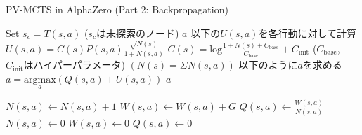 \begin{algorithm}
    \caption{PV-MCTS in AlphaZero (Part 2: Backpropagation)}
    \label{alg:mcts-2}
    \begin{algorithmic}[1]
                \State Set $s_{c} = T(s, a)$ ($s_c$は未探索のノード)
                \State {}
                \State \Return $a$
            \Else
                \State 以下の$U(s, a)$を各行動に対して計算
                \State $U(s, a)= C(s)P(s, a)\frac{\sqrt{N(s)}}{1+N(s, a)}$
                \State $C(s)=\textrm{log}\frac{1+N(s)+C_{\textrm{base}}}{C_{\textrm{base}}}+C_{\textrm{init}}$
                \State($C_{\textrm{base}}$, $C_{\textrm{init}}$はハイパーパラメータ)
                \State $(N(s)=\Sigma N(s, a))$
                \State 以下のように$a$を求める
                \State $a = {\underset{a}{\textrm{argmax}}} (Q(s, a)+U(s, a))$
                \State \Return $a$
                
            \EndIf
        \EndFunction
                \State $N(s, a) \gets  N(s, a)+1$
                \State $W(s, a) \gets  W(s, a)+G$
                \State $Q(s, a) \gets \frac{W(s, a)}{N(s, a)}$
            \EndFor
        \EndFunction
                \State $N(s, a) \gets 0$
                \State $W(s, a) \gets 0$
                \State $Q(s, a) \gets 0$
            \EndFor
        \EndFunction
    \end{algorithmic}
\end{algorithm}

